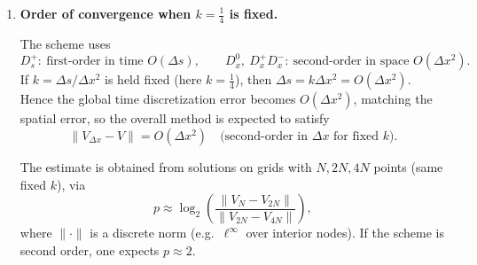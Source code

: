 \documentclass{article}
\begin{document}
\begin{enumerate}
\item[(e)] \textbf{Order of convergence when $k=\frac14$ is fixed.}

The scheme uses
\[
D_s^+:\ \text{first-order in time }O(\Delta s),
\qquad
D_x^0,\ D_x^+D_x^-:\ \text{second-order in space }O(\Delta x^2).
\]
If $k=\Delta s/\Delta x^2$ is held fixed (here $k=\tfrac14$), then $\Delta s=k\Delta x^2=O(\Delta x^2)$.
Hence the global time discretization error becomes $O(\Delta x^2)$, matching the spatial error, so the overall method is expected to satisfy
\[
\boxed{\|V_{\Delta x}-V\|=O(\Delta x^2)\quad\text{(second-order in }\Delta x\text{ for fixed }k).}
\]

The estimate is obtained from solutions on grids with $N,2N,4N$ points (same fixed $k$), via
\[
\boxed{
p \approx \log_2\!\left(\frac{\|V_N - V_{2N}\|}{\|V_{2N} - V_{4N}\|}\right),
}
\]
where $\|\cdot\|$ is a discrete norm (e.g.\ $\ell^\infty$ over interior nodes).
If the scheme is second order, one expects $p\approx 2$.

\end{enumerate}
\end{document}
